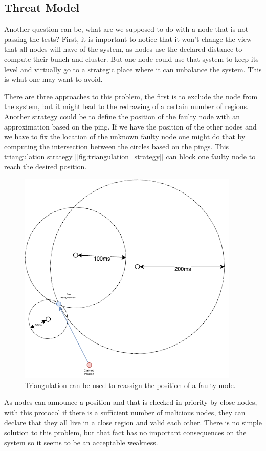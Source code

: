 \documentclass[a4paper,11pt,oneside]{report}
\begin{document}
\subsection{Threat Model}
Another question can be, what are we supposed to do with a node that is not
passing the tests? First, it is important to notice that it won't
change the view that all nodes will have of the system, as nodes use the
declared distance to compute their bunch and cluster. But one node could use
that system to keep its level and virtually go to a strategic place where it can unbalance the system.
This is what one may want to avoid. 

There are three approaches to this problem, the first is to exclude the node
from the system, but it might lead to the redrawing of a certain number of
regions. Another strategy could be to define the
position of the faulty node with an approximation based on the ping. If we have
the position of the other nodes and we have to fix the location of the unknown
faulty node one might do that by computing the intersection between the circles
based on the pings. This triangulation strategy
[\autoref{fig:triangulation_strategy}] can block one faulty node to reach the
desired position. 

\begin{figure}[!h] 
\centering
\includegraphics[width=300pt]{figures/triangulation_strategy}
\caption{Triangulation can be used to reassign the position of a faulty node. }
\label{fig:triangulation_strategy}
\end{figure}

As nodes can announce a position and that is checked in priority by close
nodes, with this protocol if there is a sufficient number of malicious nodes,
they can declare that they all live in a close region and valid each other.
There is no simple solution to this problem, but that fact has no important consequences
on the system so it seems to be an acceptable weakness.
\end{document}
